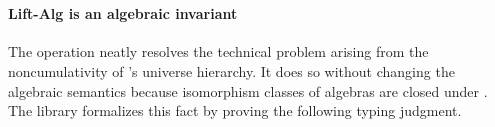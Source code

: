 \begin{code}
\AgdaSpace{}%
\AgdaSpace{}%
\AgdaSpace{}%
\AgdaSymbol{(}\AgdaSpace{}%
\AgdaSpace{}%
\AgdaSpace{}%
\AgdaSpace{}%
\AgdaSymbol{)}\AgdaSpace{}%
\AgdaSpace{}%
\<%
\\
%
\>[2]\AgdaSpace{}%
\AgdaSpace{}%
\AgdaSymbol{=}\AgdaSpace{}%
\AgdaSpace{}%
\AgdaSymbol{(}\AgdaSpace{}%
\AgdaSpace{}%
\AgdaSpace{}%
\AgdaSpace{}%
\AgdaSpace{}%
\AgdaSymbol{(}\AgdaSpace{}%
\AgdaSpace{}%
\AgdaSymbol{(}\AgdaSpace{}%
\AgdaSpace{}%
\AgdaSpace{}%
\AgdaSpace{}%
\AgdaSpace{}%
\AgdaSymbol{)))}\AgdaSpace{}%
\AgdaSymbol{(}\AgdaSpace{}%
\AgdaSpace{}%
\AgdaSymbol{)}\<%
\end{code}
\fi

\paragraph*{Lift-Alg is an algebraic invariant}
The  operation neatly resolves the technical problem arising from the
noncumulativity of \agda's universe hierarchy. It does so without changing the algebraic
semantics because isomorphism classes of algebras are closed under .
\ifshort
The \agdaalgebras library formalizes this fact by proving the following typing judgment.

\else

